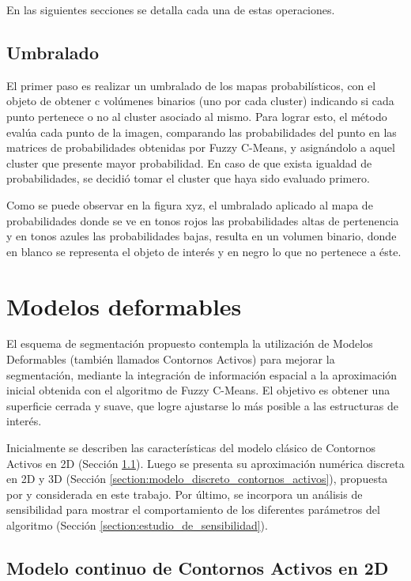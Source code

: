En las siguientes secciones se detalla cada una de estas operaciones.

\subsection{Umbralado}
El primer paso es realizar un umbralado de los mapas probabilísticos, con el objeto de obtener c volúmenes binarios (uno por cada cluster) indicando si cada punto pertenece o no al cluster asociado al mismo. Para lograr esto, el método evalúa cada punto de la imagen, comparando las probabilidades del punto en las matrices de probabilidades obtenidas por Fuzzy C-Means, y asignándolo a aquel cluster que presente mayor probabilidad. En caso de que exista igualdad de probabilidades, se decidió tomar el cluster que haya sido evaluado primero.

Como se puede observar en la figura xyz, el umbralado aplicado al mapa de probabilidades donde se ve en tonos rojos las probabilidades altas de pertenencia y en tonos azules las probabilidades bajas, resulta en un volumen binario, donde en blanco se representa el objeto de interés y en negro lo que no pertenece a éste.


\section{Modelos deformables}\label{section:modelos_deformables}
El esquema de segmentación propuesto contempla la utilización de Modelos Deformables (también llamados Contornos Activos) para mejorar la segmentación, mediante la integración de información espacial a la aproximación inicial obtenida con el algoritmo de Fuzzy C-Means. El objetivo es obtener una superficie cerrada y suave, que logre ajustarse lo más posible a las estructuras de interés.

Inicialmente se describen las características del modelo clásico de Contornos Activos en 2D \citep{kass1988snakes} (Sección \ref{section:modelo_continuo_contornos_activos}). Luego se presenta su aproximación numérica discreta en 2D y 3D (Sección \ref{section:modelo_discreto_contornos_activos}), propuesta por \cite{mcinerney2000t} y considerada en este trabajo. Por último, se incorpora un análisis de sensibilidad para mostrar el comportamiento de los diferentes parámetros del algoritmo (Sección \ref{section:estudio_de_sensibilidad}).

\subsection{Modelo continuo de Contornos Activos en 2D}\label{section:modelo_continuo_contornos_activos}

